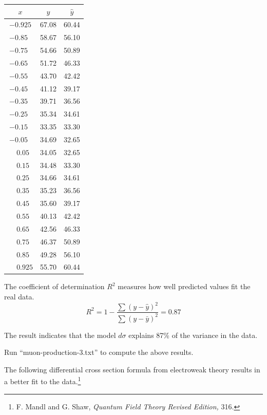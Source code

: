 \documentclass[12pt]{article}
\begin{document}
\begin{center}
\begin{tabular}{|c|c|c|}
\hline
$x$ & $y$ & $\hat{y}$ \\
\hline
$-0.925$ & 67.08 & 60.44\\
$-0.85\phantom{0}$ & 58.67 & 56.10\\
$-0.75\phantom{0}$ & 54.66 & 50.89\\
$-0.65\phantom{0}$ & 51.72 & 46.33\\
$-0.55\phantom{0}$ & 43.70 & 42.42\\
$-0.45\phantom{0}$ & 41.12 & 39.17\\
$-0.35\phantom{0}$ & 39.71 & 36.56\\
$-0.25\phantom{0}$ & 35.34 & 34.61\\
$-0.15\phantom{0}$ & 33.35 & 33.30\\
$-0.05\phantom{0}$ & 34.69 & 32.65\\
$\phantom{+}0.05\phantom{0}$ & 34.05 & 32.65\\
$\phantom{+}0.15\phantom{0}$ & 34.48 & 33.30\\
$\phantom{+}0.25\phantom{0}$ & 34.66 & 34.61\\
$\phantom{+}0.35\phantom{0}$ & 35.23 & 36.56\\
$\phantom{+}0.45\phantom{0}$ & 35.60 & 39.17\\
$\phantom{+}0.55\phantom{0}$ & 40.13 & 42.42\\
$\phantom{+}0.65\phantom{0}$ & 42.56 & 46.33\\
$\phantom{+}0.75\phantom{0}$ & 46.37 & 50.89\\
$\phantom{+}0.85\phantom{0}$ & 49.28 & 56.10\\
$\phantom{+}0.925$ & 55.70 & 60.44\\
\hline
\end{tabular}
\end{center}

\noindent
The coefficient of determination $R^2$ measures how well predicted values fit the real data.
\begin{equation*}
R^2=1-\frac{\sum(y-\hat{y})^2}{\sum(y-\bar{y})^2}=0.87
\end{equation*}

\noindent
The result indicates that the model $d\sigma$ explains 87\% of the variance in the data.

\bigskip
\noindent
Run ``muon-production-3.txt'' to compute the above results.

\bigskip
\noindent
The following differential cross section formula from electroweak
theory results in a better fit to the
data.\footnote{F. Mandl and G. Shaw, {\it Quantum Field Theory Revised Edition,} 316.}
\end{document}
